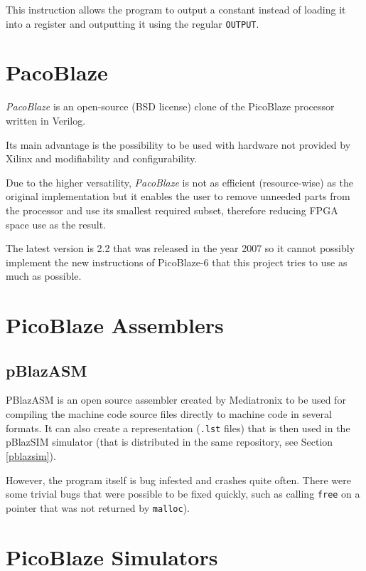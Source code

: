        This instruction allows the program to output a constant instead of loading it into a register and outputting it using the regular \texttt{OUTPUT}.

    \section{PacoBlaze}

    \emph{PacoBlaze} is an open-source (BSD license) clone of the PicoBlaze processor written in Verilog.

    Its main advantage is the possibility to be used with hardware not provided by Xilinx and modifiability and configurability. 

    Due to the higher versatility, \emph{PacoBlaze} is not as efficient (resource-wise) as the original implementation but it enables the user to remove unneeded parts from the processor and use its smallest required subset, therefore reducing FPGA space use as the result.

    The latest version is 2.2 that was released in the year 2007 so it cannot possibly implement the new instructions of PicoBlaze-6 that this project tries to use as much as possible.\cite{PacoBlaze}

    \section{PicoBlaze Assemblers}

        \subsection{pBlazASM}\label{pblazasm}

        PBlazASM is an open source assembler created by Mediatronix to be used for compiling the machine code source files directly to machine code in several formats. It can also create a representation (\texttt{.lst} files) that is then used in the pBlazSIM simulator (that is distributed in the same repository, see Section \ref{pblazsim}).\cite{PblazAsm}

        However, the program itself is bug infested and crashes quite often. There were some trivial bugs that were possible to be fixed quickly, such as calling \texttt{free} on a pointer that was not returned by \texttt{malloc}).

    \section{PicoBlaze Simulators}

